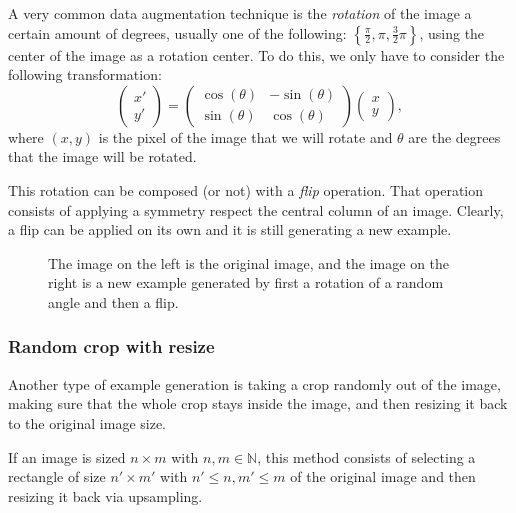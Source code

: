 A very common data augmentation technique is the \emph{rotation} of the image a certain amount of degrees, usually one of the following: $\left\{\frac{\pi}{2}, \pi, \frac{3}{2}\pi\right\}$, using the center of the image as a rotation center. To do this, we only have to consider the following transformation:
\[
\begin{pmatrix} x' \\ y' \end{pmatrix} = \begin{pmatrix} \cos(\theta) & - \sin(\theta) \\ \sin(\theta) & \cos(\theta)\end{pmatrix} \begin{pmatrix} x \\ y\end{pmatrix}  ,  
\]
where $(x,y)$ is the pixel of the image that we will rotate and $\theta$ are the degrees that the image will be rotated.

This rotation can be composed (or not) with a \emph{flip} operation. That operation consists of applying a symmetry respect the central column of an image. Clearly, a flip can be applied on its own and it is still generating a new example.

\begin{figure}[htp] 
    \centering
    \hfill%
        \caption{The image on the left is the original image, and the image on the right is a new example generated by first a rotation of a random angle and then a flip.}
\end{figure}


\subsubsection*{Random crop with resize}

Another type of example generation is taking a crop randomly out of the image, making sure that the whole crop stays inside the image, and then resizing it back to the original image size. 

If an image is sized $n\times m$ with $n,m \in \mathbb N$, this method consists of selecting a rectangle of size $n'\times m'$ with $n' \leq n, m' \leq m$ of the original image and then resizing it back via upsampling\footnotemark.

